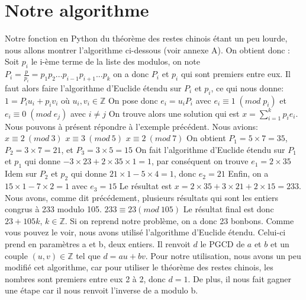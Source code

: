 \documentclass[a4paper, 11pt]{report}
\begin{document}
\newpage

\section{Notre algorithme}
Notre fonction en Python du théorème des restes chinois étant un peu lourde, 
nous allons montrer l'algorithme ci-dessous (voir annexe A). \newline
On obtient donc :
\newline
Soit $p_i$ le i-ème terme de la liste des modulos, on note \newline
$ P_i=\frac{p}{p_i}=p_1 p_2 ... p_{i-1} p_{i+1} ... p_k $   \newline
on a donc $P_i$ et $p_i$  qui sont premiers entre eux. \newline
Il faut alors faire l'algorithme d'Euclide étendu sur $P_i$ et $p_i$, ce qui nous donne: 
$1= P_i u_i + p_i v_i$ 
où 
$u_i, v_i \in  \mathbb{Z} $
\newline
On pose donc $e_i = u_i P_i$ avec $ e_i \equiv 1 \; (mod \; p_i)$ et $ e_i\equiv 0 \; (mod \; e_j)$ avec $ i\neq j$ \newline
On trouve alors une solution qui est $x=\sum_{i = 1}^{k}{p_i e_i} $.\newline
\newline
\newline
Nous pouvons à présent répondre à l'exemple précédent. Nous avions: \newline
$ x\equiv 2 \: (mod \:  3)$ 
\newline
$ x\equiv 3 \: (mod \: 5)$
\newline
$ x \equiv 2 \:(mod\: 7)$
\newline
On obtient $P_1=5\times 7=35$, $P_2=3\times 7=21 $, et $P_3=3\times 5=15$ \newline
On fait l'algorithme d'Euclide étendu sur $P_1$ et $p_1$ qui donne $-3\times 23 +2\times 35\times 1= 1 $, par conséquent on trouve $e_1=2\times 35$ \newline
Idem sur $P_2$ et $p_2$ qui donne $21\times 1 - 5\times 4=1$, donc $e_2=21$ \newline
Enfin, on a $15\times 1- 7\times 2 = 1 $ avec $e_3=15$ \newline
Le résultat est $x=2\times 35 + 3\times 21 + 2\times 15 =233$.
Nous avons, comme dit précédement, plusieurs résultats qui sont les entiers congrus à 233 modulo 105. \newline
$233\equiv 23 (mod \: 105)$ \newline
Le résultat final est donc $23+105k$, $k \in \mathbb{Z} $.
Si on reprend notre problème, on a donc 23 bonbons.
\newline
\newline
Comme vous pouvez le voir, nous avons utilisé l'algorithme d'Euclide étendu. Celui-ci prend en paramètres a et b, deux entiers.
Il renvoit $d$ le PGCD de $a$ et $b$ et un couple $(u,v) \in \mathbb{Z} $ tel que $d=au+bv$.
\newline
Pour notre utilisation, nous avons un peu modifié cet algorithme, car pour utiliser le théorème des restes chinois, les nombres sont premiers entre eux 2 à 2,
donc $d=1$. De plus, il nous fait gagner une étape car il nous renvoit l'inverse de a modulo b.
\end{document}
